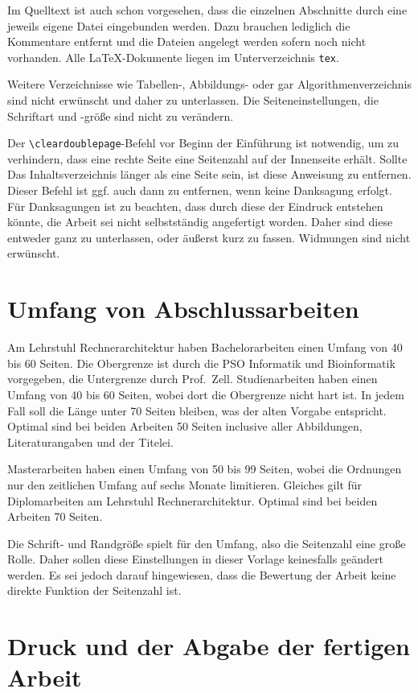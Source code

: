Im Quelltext ist auch schon vorgesehen, dass die einzelnen Abschnitte durch eine
jeweils eigene Datei eingebunden werden. Dazu brauchen lediglich die Kommentare
entfernt und die Dateien angelegt werden sofern noch nicht vorhanden. Alle
\LaTeX-Dokumente liegen im Unterverzeichnis \texttt{tex}.

Weitere Verzeichnisse wie Tabellen-, Abbildungs- oder gar Algorithmenverzeichnis
sind nicht er\-wünscht und daher zu unterlassen. Die Seiteneinstellungen, die
Schriftart und -größe sind nicht zu verändern.

Der \verb!\cleardoublepage!-Befehl vor Beginn der Einführung ist notwendig, um
zu verhindern, dass eine rechte Seite eine Seitenzahl auf der Innenseite erhält.
Sollte Das Inhaltsverzeichnis länger als eine Seite sein, ist diese Anweisung zu
entfernen. Dieser Befehl ist ggf. auch dann zu entfernen, wenn keine Danksagung
erfolgt. Für Danksagungen ist zu beachten, dass durch diese der Eindruck
entstehen könnte, die Arbeit sei nicht selbstständig angefertigt worden. Daher
sind diese entweder ganz zu unterlassen, oder äußerst kurz zu fassen.
Widmungen sind nicht erwünscht.


\section{Umfang von Abschlussarbeiten}

Am Lehrstuhl Rechnerarchitektur haben Bachelorarbeiten einen Umfang von 40 bis
60 Seiten. Die Obergrenze ist durch die PSO Informatik und Bioinformatik
vorgegeben, die Untergrenze durch Prof.~Zell. Studienarbeiten haben einen Umfang
von 40 bis 60 Seiten, wobei dort die Obergrenze nicht hart ist. In jedem Fall
soll die Länge unter 70 Seiten bleiben, was der alten Vorgabe entspricht.
Optimal sind bei beiden Arbeiten 50 Seiten inclusive aller Abbildungen,
Literaturangaben und der Titelei.

Masterarbeiten haben einen Umfang von 50 bis 99 Seiten, wobei die Ordnungen nur
den zeitlichen Umfang auf sechs Monate limitieren. Gleiches gilt für
Diplomarbeiten am Lehrstuhl Rechnerarchitektur. Optimal sind bei beiden Arbeiten
70 Seiten.

Die Schrift- und Randgröße spielt für den Umfang, also die Seitenzahl eine große
Rolle. Daher sollen diese Einstellungen in dieser Vorlage keinesfalls geändert
werden. Es sei jedoch darauf hingewiesen, dass die Bewertung der Arbeit keine
direkte Funktion der Seitenzahl ist.


\section{Druck und der Abgabe der fertigen Arbeit}

